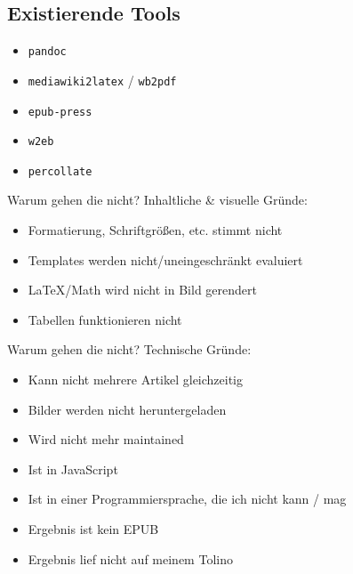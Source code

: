 \documentclass[9pt]{beamer}
\begin{document}
	\subsection{Existierende Tools}
	
	\begin{frame}
		\begin{itemize}
			\item \texttt{pandoc}
			\item \texttt{mediawiki2latex} / \texttt{wb2pdf}
			\item \texttt{epub-press}
			\item \texttt{w2eb}
			\item \texttt{percollate}
		\end{itemize}
	\end{frame}

	\begin{frame}{Warum gehen die nicht?}
		Inhaltliche \& visuelle Gründe:
		\begin{itemize}
			\item Formatierung, Schriftgrößen, etc. stimmt nicht
			\item Templates werden nicht/uneingeschränkt evaluiert
			\item \LaTeX/Math wird nicht in Bild gerendert
			\item Tabellen funktionieren nicht
		\end{itemize}
	\end{frame}

	\begin{frame}{Warum gehen die nicht?}
		Technische Gründe:
		\begin{itemize}
			\item Kann nicht mehrere Artikel gleichzeitig
			\item Bilder werden nicht heruntergeladen
			\item Wird nicht mehr maintained
			\item Ist in JavaScript
			\item Ist in einer Programmiersprache, die ich nicht kann / mag
			\item Ergebnis ist kein EPUB
			\item Ergebnis lief nicht auf meinem Tolino
		\end{itemize}
	\end{frame}
	
\end{document}
